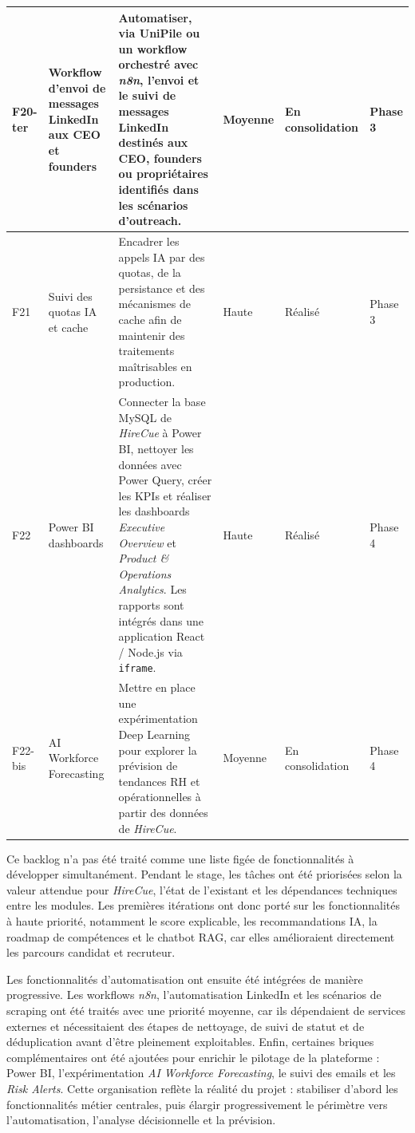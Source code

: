\begin{longtable}{|p{0.85cm}|p{2.8cm}|p{4.9cm}|p{1.65cm}|p{1.55cm}|p{1.25cm}|}
\hline
F20-ter & Workflow d'envoi de messages LinkedIn aux CEO et founders & Automatiser, via UniPile ou un workflow orchestré avec \textit{n8n}, l'envoi et le suivi de messages LinkedIn destinés aux CEO, founders ou propriétaires identifiés dans les scénarios d'outreach. & Moyenne & En consolidation & Phase 3 \\
\hline
F21 & Suivi des quotas IA et cache & Encadrer les appels IA par des quotas, de la persistance et des mécanismes de cache afin de maintenir des traitements maîtrisables en production. & Haute & Réalisé & Phase 3 \\
\hline
F22 & Power BI dashboards & Connecter la base MySQL de \textit{HireCue} à Power BI, nettoyer les données avec Power Query, créer les KPIs et réaliser les dashboards \textit{Executive Overview} et \textit{Product \& Operations Analytics}. Les rapports sont intégrés dans une application React / Node.js via \texttt{iframe}. & Haute & Réalisé & Phase 4 \\
\hline
F22-bis & AI Workforce Forecasting & Mettre en place une expérimentation Deep Learning pour explorer la prévision de tendances RH et opérationnelles à partir des données de \textit{HireCue}. & Moyenne & En consolidation & Phase 4 \\
\hline
\end{longtable}
\setlength{\tabcolsep}{6pt}
\normalsize

Ce backlog n'a pas été traité comme une liste figée de fonctionnalités à développer simultanément. Pendant le stage, les tâches ont été priorisées selon la valeur attendue pour \textit{HireCue}, l'état de l'existant et les dépendances techniques entre les modules. Les premières itérations ont donc porté sur les fonctionnalités à haute priorité, notamment le score explicable, les recommandations IA, la roadmap de compétences et le chatbot RAG, car elles amélioraient directement les parcours candidat et recruteur.

Les fonctionnalités d'automatisation ont ensuite été intégrées de manière progressive. Les workflows \textit{n8n}, l'automatisation LinkedIn et les scénarios de scraping ont été traités avec une priorité moyenne, car ils dépendaient de services externes et nécessitaient des étapes de nettoyage, de suivi de statut et de déduplication avant d'être pleinement exploitables. Enfin, certaines briques complémentaires ont été ajoutées pour enrichir le pilotage de la plateforme : Power BI, l'expérimentation \textit{AI Workforce Forecasting}, le suivi des emails et les \textit{Risk Alerts}. Cette organisation reflète la réalité du projet : stabiliser d'abord les fonctionnalités métier centrales, puis élargir progressivement le périmètre vers l'automatisation, l'analyse décisionnelle et la prévision.

